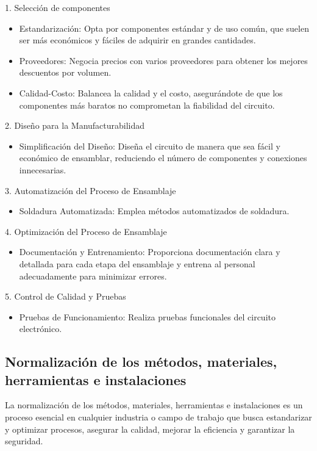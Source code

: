     1. Selección de componentes
    \begin{itemize}
    \item Estandarización: Opta por componentes estándar y de uso común, que suelen ser más económicos y fáciles de adquirir en grandes cantidades.
    \item Proveedores: Negocia precios con varios proveedores para obtener los mejores descuentos por volumen.
    \item Calidad-Costo: Balancea la calidad y el costo, asegurándote de que los componentes más baratos no comprometan la fiabilidad del circuito.
    \end{itemize}
    2. Diseño para la Manufacturabilidad
    \begin{itemize}
    \item Simplificación del Diseño: Diseña el circuito de manera que sea fácil y económico de ensamblar, reduciendo el número de componentes y conexiones innecesarias.
    \end{itemize}
    3. Automatización del Proceso de Ensamblaje 
    \begin{itemize}
    \item Soldadura Automatizada: Emplea métodos automatizados de soldadura.
    \end{itemize}
    4. Optimización del Proceso de Ensamblaje 
    \begin{itemize}
    \item Documentación y Entrenamiento: Proporciona documentación clara y detallada para cada etapa del ensamblaje y entrena al personal adecuadamente para minimizar errores.
    \end{itemize}
    5. Control de Calidad y Pruebas 
    \begin{itemize}
    \item Pruebas de Funcionamiento: Realiza pruebas funcionales del circuito electrónico.
    \end{itemize}
    \subsection{Normalización de los métodos, materiales, herramientas e instalaciones}
    
    La normalización de los métodos, materiales, herramientas e instalaciones es un proceso esencial en cualquier industria o campo de trabajo que busca estandarizar y optimizar procesos, asegurar la calidad, mejorar la eficiencia y garantizar la seguridad.
    
